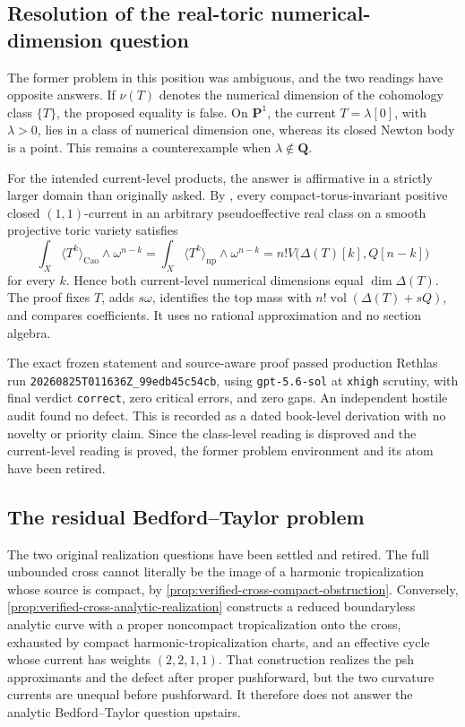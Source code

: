 \subsection{Resolution of the real-toric numerical-dimension question}

The former problem in this position was ambiguous, and the two readings have
opposite answers.  If \(\nu(T)\) denotes the numerical dimension of the
cohomology class \(\{T\}\), the proposed equality is false.  On
\(\mathbf P^1\), the current \(T=\lambda[0]\), with
\(\lambda>0\), lies in a class of numerical dimension one, whereas its
closed Newton body is a point.  This remains a counterexample when
\(\lambda\notin\mathbf Q\).

For the intended current-level products, the answer is affirmative in a
strictly larger domain than originally asked.  By
, every compact-torus-invariant positive
closed \((1,1)\)-current in an arbitrary pseudoeffective real class on a
smooth projective toric variety satisfies
\[
 \int_X\langle T^k\rangle_{\mathrm{Cao}}\wedge\omega^{n-k}
 =\int_X\langle T^k\rangle_{\mathrm{np}}\wedge\omega^{n-k}
 =n!V\bigl(\Delta(T)[k],Q[n-k]\bigr)
\]
for every \(k\).  Hence both current-level numerical dimensions equal
\(\dim\Delta(T)\).  The proof fixes \(T\), adds \(s\omega\), identifies the
top mass with \(n!\operatorname{vol}(\Delta(T)+sQ)\), and compares
coefficients.  It uses no rational approximation and no section algebra.

The exact frozen statement and source-aware proof passed production Rethlas
run \nolinkurl{20260825T011636Z_99edb45c54cb}, using
\texttt{gpt-5.6-sol} at \texttt{xhigh} scrutiny, with final verdict
\texttt{correct}, zero critical errors, and zero gaps.  An independent
hostile audit found no defect.  This is recorded as a dated book-level
derivation with no novelty or priority claim.  Since the class-level reading
is disproved and the current-level reading is proved, the former problem
environment and its atom have been retired.

\subsection{The residual Bedford--Taylor problem}

The two original realization questions have been settled and retired.  The
full unbounded cross cannot literally be the image of a harmonic
tropicalization whose source is compact, by
\cref{prop:verified-cross-compact-obstruction}.  Conversely,
\cref{prop:verified-cross-analytic-realization} constructs a reduced
boundaryless analytic curve with a proper noncompact tropicalization onto
the cross, exhausted by compact harmonic-tropicalization charts, and an
effective cycle whose current has weights \((2,2,1,1)\).  That construction
realizes the psh approximants and the defect after proper pushforward, but
the two curvature currents are unequal before pushforward.  It therefore
does not answer the analytic Bedford--Taylor question upstairs.

